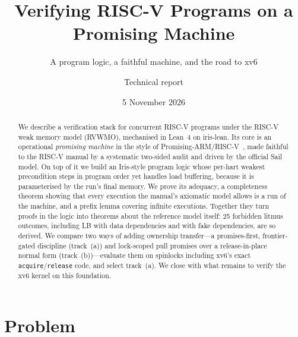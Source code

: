 \documentclass[sigplan,screen,nonacm]{acmart}
\newcommand{\rvwmo}{RVWMO\xspace}
\newcommand{\code}[1]{\texttt{#1}}
\begin{document}
\title{Verifying RISC-V Programs on a Promising Machine}
\subtitle{A program logic, a faithful machine, and the road to xv6}

\author{Technical report}
\date{5 November 2026}

\begin{abstract}
We describe a verification stack for concurrent RISC-V programs under the RISC-V weak memory model (\rvwmo),
mechanised in Lean~4 on iris-lean. Its core is an operational \emph{promising machine} in the style of
Promising-ARM/RISC-V~\cite{pulte19}, made faithful to the RISC-V manual by a systematic two-sided audit and driven by
the official Sail model. On top of it we build an Iris-style program logic whose per-hart weakest precondition
steps in program order yet handles load buffering, because it is parameterised by the run's final memory.
We prove its adequacy, a completeness theorem showing that every execution the manual's axiomatic model allows is a
run of the machine, and a prefix lemma covering infinite executions. Together they turn proofs in the logic into
theorems about the reference model itself: 25 forbidden litmus outcomes, including LB with data dependencies and
with fake dependencies, are so derived. We compare two ways of adding ownership transfer---a promises-first,
frontier-gated discipline (track~(a)) and lock-scoped pull promises over a release-in-place normal form
(track~(b))---evaluate them on spinlocks including xv6's exact \code{acquire}/\code{release} code, and select
track~(a). We close with what remains to verify the xv6 kernel on this foundation.
\end{abstract}

\maketitle

\section{Problem}
\end{document}
